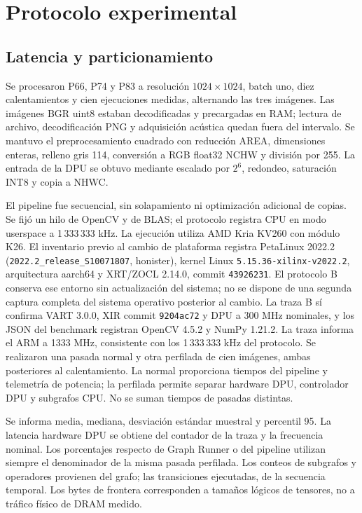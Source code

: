 \documentclass[10pt,conference,a4paper]{elektron}
\begin{document}
\section{Protocolo experimental}
\subsection{Latencia y particionamiento}
Se procesaron P66, P74 y P83 a resolución $1024\times1024$, batch uno, diez calentamientos y cien ejecuciones medidas, alternando las tres imágenes. Las imágenes BGR uint8 estaban decodificadas y precargadas en RAM; lectura de archivo, decodificación PNG y adquisición acústica quedan fuera del intervalo. Se mantuvo el preprocesamiento cuadrado con reducción AREA, dimensiones enteras, relleno gris 114, conversión a RGB float32 NCHW y división por 255. La entrada de la DPU se obtuvo mediante escalado por $2^6$, redondeo, saturación INT8 y copia a NHWC.

El pipeline fue secuencial, sin solapamiento ni optimización adicional de copias. Se fijó un hilo de OpenCV y de BLAS; el protocolo registra CPU en modo userspace a 1\,333\,333 kHz. La ejecución utiliza AMD Kria KV260 con módulo K26. El inventario previo al cambio de plataforma registra PetaLinux 2022.2 (\nolinkurl{2022.2_release_S10071807}, honister), kernel Linux \nolinkurl{5.15.36-xilinx-v2022.2}, arquitectura aarch64 y XRT/ZOCL 2.14.0, commit \texttt{43926231}. El protocolo B conserva ese entorno sin actualización del sistema; no se dispone de una segunda captura completa del sistema operativo posterior al cambio. La traza B sí confirma VART 3.0.0, XIR commit \texttt{9204ac72} y DPU a 300 MHz nominales, y los JSON del benchmark registran OpenCV 4.5.2 y NumPy 1.21.2. La traza informa el ARM a 1333 MHz, consistente con los 1\,333\,333 kHz del protocolo. Se realizaron una pasada normal y otra perfilada de cien imágenes, ambas posteriores al calentamiento. La normal proporciona tiempos del pipeline y telemetría de potencia; la perfilada permite separar hardware DPU, controlador DPU y subgrafos CPU. No se suman tiempos de pasadas distintas.

Se informa media, mediana, desviación estándar muestral y percentil 95. La latencia hardware DPU se obtiene del contador de la traza y la frecuencia nominal. Los porcentajes respecto de Graph Runner o del pipeline utilizan siempre el denominador de la misma pasada perfilada. Los conteos de subgrafos y operadores provienen del grafo; las transiciones ejecutadas, de la secuencia temporal. Los bytes de frontera corresponden a tamaños lógicos de tensores, no a tráfico físico de DRAM medido.
\end{document}
